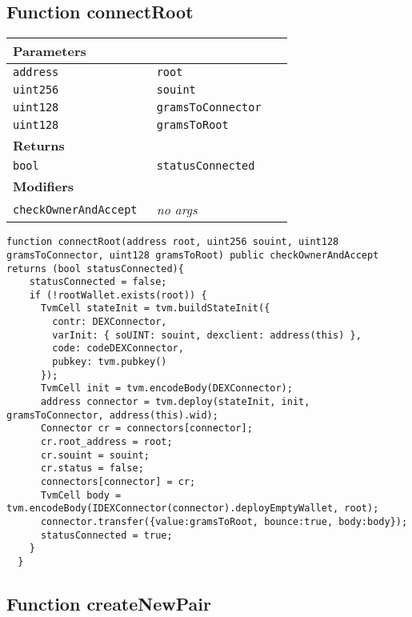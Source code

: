 \subsection{Function connectRoot}


\ifsoltables
\noindent\begin{tabular}{|l|l|p{5cm}|}\hline
\multicolumn{3}{|l|}{\bf Parameters}\\\hline
\tt address & \tt root &\\\hline
\tt uint256 & \tt souint &\\\hline
\tt uint128 & \tt gramsToConnector &\\\hline
\tt uint128 & \tt gramsToRoot &\\\hline
\multicolumn{3}{|l|}{\bf Returns}\\\hline
\tt bool & \tt statusConnected &\\\hline
\multicolumn{3}{|l|}{\bf Modifiers}\\\hline
\tt checkOwnerAndAccept & {\em no args} &\\\hline
\end{tabular}
\fi

\vspace{2cm}

\begin{lstlisting}[firstnumber=158]
  function connectRoot(address root, uint256 souint, uint128 gramsToConnector, uint128 gramsToRoot) public checkOwnerAndAccept returns (bool statusConnected){
    statusConnected = false;
    if (!rootWallet.exists(root)) {
      TvmCell stateInit = tvm.buildStateInit({
        contr: DEXConnector,
        varInit: { soUINT: souint, dexclient: address(this) },
        code: codeDEXConnector,
        pubkey: tvm.pubkey()
      });
      TvmCell init = tvm.encodeBody(DEXConnector);
      address connector = tvm.deploy(stateInit, init, gramsToConnector, address(this).wid);
      Connector cr = connectors[connector];
      cr.root_address = root;
      cr.souint = souint;
      cr.status = false;
      connectors[connector] = cr;
      TvmCell body = tvm.encodeBody(IDEXConnector(connector).deployEmptyWallet, root);
      connector.transfer({value:gramsToRoot, bounce:true, body:body});
      statusConnected = true;
    }
  }
\end{lstlisting}

\subsection{Function createNewPair}


